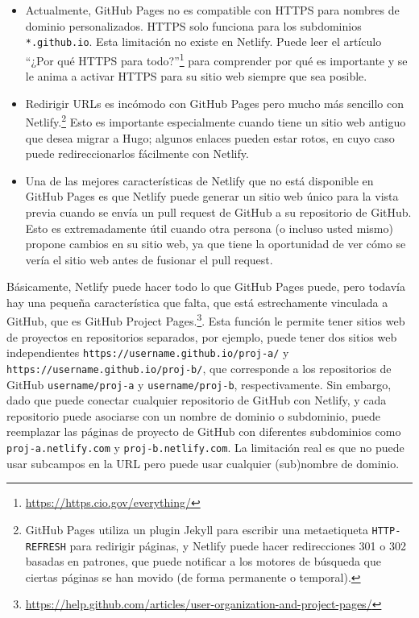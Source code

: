 \documentclass[12pt,]{krantz}
\renewcommand{\href}[2]{#2\footnote{\url{#1}}}
\theoremstyle{definition}
\theoremstyle{definition}
\theoremstyle{definition}
\theoremstyle{remark}
\begin{document}
\begin{itemize}
\item
  Actualmente, GitHub Pages no es compatible con HTTPS para nombres de
  dominio personalizados. HTTPS solo funciona para los subdominios
  \texttt{*.github.io}. Esta limitación no existe en Netlify. Puede leer
  el artículo \href{https://https.cio.gov/everything/}{``¿Por qué HTTPS
  para todo?''} para comprender por qué es importante y se le anima a
  activar HTTPS para su sitio web siempre que sea posible.
\item
  Redirigir URLs es incómodo con GitHub Pages pero mucho más sencillo
  con Netlify.\footnote{GitHub Pages utiliza un plugin Jekyll para
    escribir una metaetiqueta \texttt{HTTP-REFRESH} para redirigir
    páginas, y Netlify puede hacer redirecciones 301 o 302 basadas en
    patrones, que puede notificar a los motores de búsqueda que ciertas
    páginas se han movido (de forma permanente o temporal).} Esto es
  importante especialmente cuando tiene un sitio web antiguo que desea
  migrar a Hugo; algunos enlaces pueden estar rotos, en cuyo caso puede
  redireccionarlos fácilmente con Netlify.
\item
  Una de las mejores características de Netlify que no está disponible
  en GitHub Pages es que Netlify puede generar un sitio web único para
  la vista previa cuando se envía un pull request de GitHub a su
  repositorio de GitHub. Esto es extremadamente útil cuando otra persona
  (o incluso usted mismo) propone cambios en su sitio web, ya que tiene
  la oportunidad de ver cómo se vería el sitio web antes de fusionar el
  pull request.
\end{itemize}

Básicamente, Netlify puede hacer todo lo que GitHub Pages puede, pero
todavía hay una pequeña característica que falta, que está estrechamente
vinculada a GitHub, que es GitHub
\href{https://help.github.com/articles/user-organization-and-project-pages/}{Project
Pages.}. Esta función le permite tener sitios web de proyectos en
repositorios separados, por ejemplo, puede tener dos sitios web
independientes \texttt{https://username.github.io/proj-a/} y
\texttt{https://username.github.io/proj-b/}, que corresponde a los
repositorios de GitHub \texttt{username/proj-a} y
\texttt{username/proj-b}, respectivamente. Sin embargo, dado que puede
conectar cualquier repositorio de GitHub con Netlify, y cada repositorio
puede asociarse con un nombre de dominio o subdominio, puede reemplazar
las páginas de proyecto de GitHub con diferentes subdominios como
\texttt{proj-a.netlify.com} y \texttt{proj-b.netlify.com}. La limitación
real es que no puede usar subcampos en la URL pero puede usar cualquier
(sub)nombre de dominio.
\end{document}
